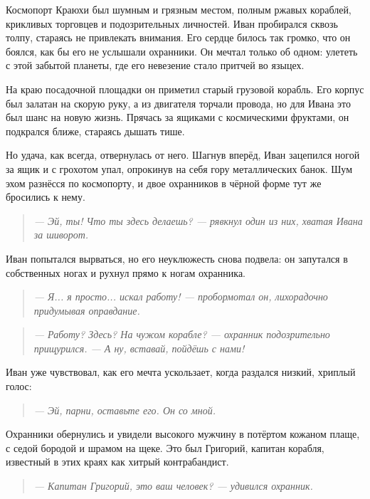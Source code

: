 \documentclass[12pt,a4paper]{book}
\newenvironment{dialogue}{\begin{quote}\itshape}{\end{quote}}
\begin{document}
Космопорт Краюхи был шумным и грязным местом, полным ржавых кораблей, крикливых торговцев и подозрительных личностей. Иван пробирался сквозь толпу, стараясь не привлекать внимания. Его сердце билось так громко, что он боялся, как бы его не услышали охранники. Он мечтал только об одном: улететь с этой забытой планеты, где его невезение стало притчей во языцех.

На краю посадочной площадки он приметил старый грузовой корабль. Его корпус был залатан на скорую руку, а из двигателя торчали провода, но для Ивана это был шанс на новую жизнь. Прячась за ящиками с космическими фруктами, он подкрался ближе, стараясь дышать тише.

Но удача, как всегда, отвернулась от него. Шагнув вперёд, Иван зацепился ногой за ящик и с грохотом упал, опрокинув на себя гору металлических банок. Шум эхом разнёсся по космопорту, и двое охранников в чёрной форме тут же бросились к нему.

\begin{dialogue}
--- Эй, ты! Что ты здесь делаешь? --- рявкнул один из них, хватая Ивана за шиворот.
\end{dialogue}

Иван попытался вырваться, но его неуклюжесть снова подвела: он запутался в собственных ногах и рухнул прямо к ногам охранника.

\begin{dialogue}
--- Я... я просто... искал работу! --- пробормотал он, лихорадочно придумывая оправдание.
\end{dialogue}

\begin{dialogue}
--- Работу? Здесь? На чужом корабле? --- охранник подозрительно прищурился. --- А ну, вставай, пойдёшь с нами!
\end{dialogue}

Иван уже чувствовал, как его мечта ускользает, когда раздался низкий, хриплый голос:

\begin{dialogue}
--- Эй, парни, оставьте его. Он со мной.
\end{dialogue}

Охранники обернулись и увидели высокого мужчину в потёртом кожаном плаще, с седой бородой и шрамом на щеке. Это был Григорий, капитан корабля, известный в этих краях как хитрый контрабандист.

\begin{dialogue}
--- Капитан Григорий, это ваш человек? --- удивился охранник.
\end{dialogue}
\end{document}
